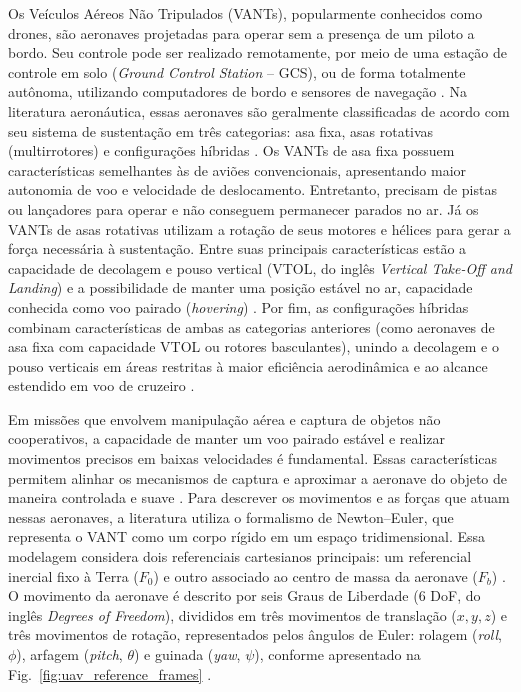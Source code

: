 

Os Veículos Aéreos Não Tripulados (VANTs), popularmente conhecidos como drones, são aeronaves projetadas para operar sem a presença de um piloto a bordo. Seu controle pode ser realizado remotamente, por meio de uma estação de controle em solo (\textit{Ground Control Station} -- GCS), ou de forma totalmente autônoma, utilizando computadores de bordo e sensores de navegação \cite{bonyan2018}. Na literatura aeronáutica, essas aeronaves são geralmente classificadas de acordo com seu sistema de sustentação em três categorias: asa fixa, asas rotativas (multirrotores) e configurações híbridas \cite{carvajal2024}. Os VANTs de asa fixa possuem características semelhantes às de aviões convencionais, apresentando maior autonomia de voo e velocidade de deslocamento. Entretanto, precisam de pistas ou lançadores para operar e não conseguem permanecer parados no ar. Já os VANTs de asas rotativas utilizam a rotação de seus motores e hélices para gerar a força necessária à sustentação. Entre suas principais características estão a capacidade de decolagem e pouso vertical (VTOL, do inglês \textit{Vertical Take-Off and Landing}) e a possibilidade de manter uma posição estável no ar, capacidade conhecida como voo pairado (\textit{hovering}) \cite{cocuzza2021}. Por fim, as configurações híbridas combinam características de ambas as categorias anteriores (como aeronaves de asa fixa com capacidade VTOL ou rotores basculantes), unindo a decolagem e o pouso verticais em áreas restritas à maior eficiência aerodinâmica e ao alcance estendido em voo de cruzeiro \cite{carvajal2024}.

Em missões que envolvem manipulação aérea e captura de objetos não cooperativos, a capacidade de manter um voo pairado estável e realizar movimentos precisos em baixas velocidades é fundamental. Essas características permitem alinhar os mecanismos de captura e aproximar a aeronave do objeto de maneira controlada e suave \cite{cocuzza2021, meng2020, bonyan2018}. Para descrever os movimentos e as forças que atuam nessas aeronaves, a literatura utiliza o formalismo de Newton--Euler, que representa o VANT como um corpo rígido em um espaço tridimensional. Essa modelagem considera dois referenciais cartesianos principais: um referencial inercial fixo à Terra ($F_0$) e outro associado ao centro de massa da aeronave ($F_b$) \cite{adriansyah2017}. O movimento da aeronave é descrito por seis Graus de Liberdade (6 DoF, do inglês \textit{Degrees of Freedom}), divididos em três movimentos de translação ($x, y, z$) e três movimentos de rotação, representados pelos ângulos de Euler: rolagem (\textit{roll}, $\phi$), arfagem (\textit{pitch}, $\theta$) e guinada (\textit{yaw}, $\psi$), conforme apresentado na Fig.~\ref{fig:uav_reference_frames} \cite{sciortino2018}.

